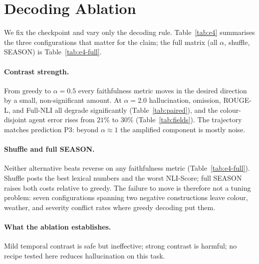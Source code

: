 \section{Decoding Ablation}
\label{sec:ablation}

We fix the \crashlogic{} checkpoint and vary only the decoding rule.
Table~\ref{tab:e4} summarises the three configurations that matter for the claim; the full matrix (all $\alpha$, shuffle, SEASON) is Table~\ref{tab:e4-full}.



\paragraph{Contrast strength.}
From greedy to $\alpha{=}0.5$ every faithfulness metric moves in the desired direction by a small, non-significant amount.
At $\alpha{=}2.0$ hallucination, omission, ROUGE-L, and Full-NLI all degrade significantly (Table~\ref{tab:paired}), and the colour-disjoint agent error rises from $21\%$ to $30\%$ (Table~\ref{tab:fields}).
The trajectory matches prediction P3: beyond $\alpha{\approx}1$ the amplified component is mostly noise.

\paragraph{Shuffle and full SEASON.}
Neither alternative beats reverse \tcd{} on any faithfulness metric (Table~\ref{tab:e4-full}).
Shuffle posts the best lexical numbers and the worst NLI-Score; full SEASON raises both costs relative to greedy.
The failure to move \Hcost{} is therefore not a tuning problem: seven configurations spanning two negative constructions leave colour, weather, and severity conflict rates where greedy decoding put them.

\paragraph{What the ablation establishes.}
Mild temporal contrast is safe but ineffective; strong contrast is harmful; no recipe tested here reduces hallucination on this task.
